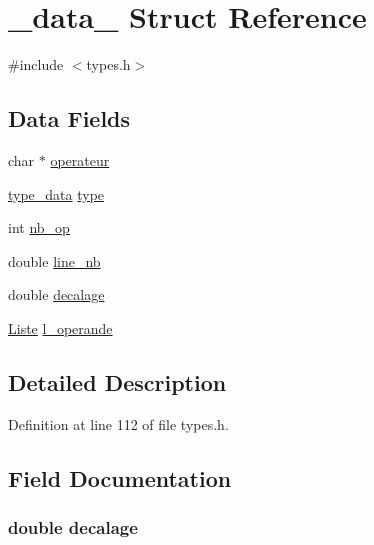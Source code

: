 \hypertarget{struct__data__}{\section{\-\_\-data\-\_\- Struct Reference}
\label{struct__data__}
}


{\ttfamily \#include $<$types.\-h$>$}

\subsection*{Data Fields}
\begin{DoxyCompactItemize}
\item 
char $\ast$ \hyperlink{struct__data___adc2a267b945f31e8e0dad4b528128cab}{operateur}
\item 
\hyperlink{types_8h_a7faf8310f85d4b91ee4ec3f72cfc2d43}{type\-\_\-data} \hyperlink{struct__data___a610c78eb1986b43eaacecfddf32b24d2}{type}
\item 
int \hyperlink{struct__data___a88a29c0db6a919d126d1c94d573dd711}{nb\-\_\-op}
\item 
double \hyperlink{struct__data___a808a37180ef5a21555b2f0f68cf73cb6}{line\-\_\-nb}
\item 
double \hyperlink{struct__data___aac945295366b3dadfd1ec0da01eb6cb8}{decalage}
\item 
\hyperlink{liste_8h_a5268448ae2a031c105e053d5ea682580}{Liste} \hyperlink{struct__data___acdac487d99d10dba873a0f07707b220f}{l\-\_\-operande}
\end{DoxyCompactItemize}


\subsection{Detailed Description}


Definition at line 112 of file types.\-h.



\subsection{Field Documentation}
\hypertarget{struct__data___aac945295366b3dadfd1ec0da01eb6cb8}{
\subsubsection[{decalage}]{\setlength{\rightskip}{0pt plus 5cm}double decalage}}\label{struct__data___aac945295366b3dadfd1ec0da01eb6cb8}


